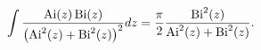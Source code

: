 \[\int\frac{\mathop{\mathrm{Ai}\/}\nolimits\!\left(z\right)\mathop{\mathrm{Bi}\/%
}\nolimits\!\left(z\right)}{\left({\mathop{\mathrm{Ai}\/}\nolimits^{2}}\!\left%
(z\right)+{\mathop{\mathrm{Bi}\/}\nolimits^{2}}\!\left(z\right)\right)^{2}}dz=%
\frac{\pi}{2}\frac{{\mathop{\mathrm{Bi}\/}\nolimits^{2}}\!\left(z\right)}{{%
\mathop{\mathrm{Ai}\/}\nolimits^{2}}\!\left(z\right)+{\mathop{\mathrm{Bi}\/}%
\nolimits^{2}}\!\left(z\right)}.\]